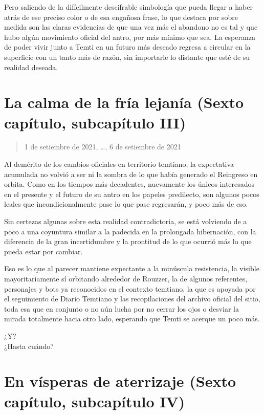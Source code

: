 \documentclass[
  spanish,
]{book}
\begin{document}
Pero saliendo de la difícilmente descifrable simbología que pueda llegar a haber atrás de ese preciso color o de esa engañosa frase, lo que destaca por sobre medida son las claras evidencias de que una vez más el abandono no es tal y que hubo algún movimiento oficial del antro, por más mínimo que sea. La esperanza de poder vivir junto a Temti en un futuro más deseado regresa a circular en la superficie con un tanto más de razón, sin importarle lo distante que esté de su realidad deseada.

\hypertarget{la-calma-de-la-fruxeda-lejanuxeda-sexto-capuxedtulo-subcapuxedtulo-iii}{%
\section{La calma de la fría lejanía (Sexto capítulo, subcapítulo III)}\label{la-calma-de-la-fruxeda-lejanuxeda-sexto-capuxedtulo-subcapuxedtulo-iii}}

\begin{quote}
1 de setiembre de 2021, \ldots, 6 de setiembre de 2021
\end{quote}

Al demérito de los cambios oficiales en territorio temtiano, la expectativa acumulada no volvió a ser ni la sombra de lo que había generado el Reingreso en orbita. Como en los tiempos más decadentes, nuevamente los únicos interesados en el presente y el futuro de su antro en los papeles predilecto, son algunos pocos leales que incondicionalmente pase lo que pase regresarán, y poco más de eso.

Sin certezas algunas sobre esta realidad contradictoria, se está volviendo de a poco a una coyuntura similar a la padecida en la prolongada hibernación, con la diferencia de la gran incertidumbre y la prontitud de lo que ocurrió más lo que pueda estar por cambiar.

Eso es lo que al parecer mantiene expectante a la minúscula resistencia, la visible mayoritariamente sí orbitando alrededor de Rouzzer, la de algunos referentes, personajes y bots ya reconocidos en el contexto temtiano, la que es apoyada por el seguimiento de Diario Temtiano y las recopilaciones del archivo oficial del sitio, toda esa que en conjunto o no aún lucha por no cerrar los ojos o desviar la mirada totalmente hacia otro lado, esperando que Temti se acerque un poco más.

¿Y?\\
¿Hasta cuándo?

\hypertarget{en-vuxedsperas-de-aterrizaje-sexto-capuxedtulo-subcapuxedtulo-iv}{%
\section{En vísperas de aterrizaje (Sexto capítulo, subcapítulo IV)}\label{en-vuxedsperas-de-aterrizaje-sexto-capuxedtulo-subcapuxedtulo-iv}}
\end{document}
